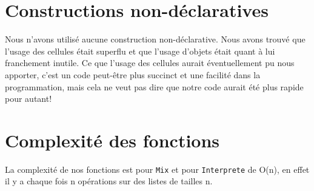 \documentclass[a4paper,12pt,oneside ]{article}
\begin{document}
\section{Constructions non-déclaratives}
Nous n'avons utilisé aucune construction non-déclarative. Nous avons trouvé que l'usage des cellules était superflu et que l'usage d'objets était quant à lui franchement inutile. Ce que l'usage des cellules aurait éventuellement pu nous apporter, c'est un code peut-être plus succinct et une facilité dans la programmation, mais cela ne veut pas dire que notre code aurait été plus rapide pour autant!

\section{Complexité des fonctions}
La complexité de nos fonctions est pour \texttt{Mix} et pour \texttt{Interprete} de O(n), en effet il y a chaque fois n opérations sur des listes de tailles n. 
\end{document}
